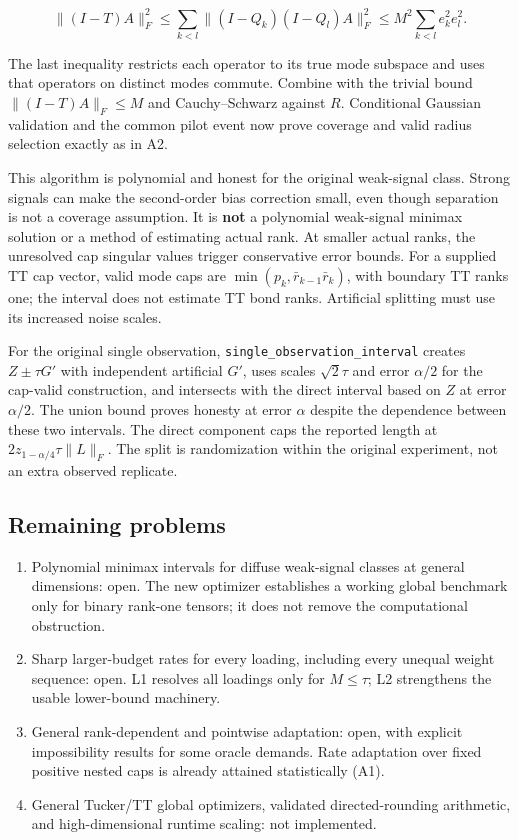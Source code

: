 \documentclass[
  10pt,
]{article}
\providecommand{\tightlist}{%
  \setlength{\itemsep}{0pt}\setlength{\parskip}{0pt}}
\begin{document}
\[\|(I-T)A\|_F^2\le\sum_{k<l}
\|(I-Q_k)(I-Q_l)A\|_F^2
\le M^2\sum_{k<l}e_k^2e_l^2.\]

The last inequality restricts each operator to its true mode subspace
and uses that operators on distinct modes commute. Combine with the
trivial bound \(\|(I-T)A\|_F\le M\) and Cauchy--Schwarz against \(R\).
Conditional Gaussian validation and the common pilot event now prove
coverage and valid radius selection exactly as in A2.

This algorithm is polynomial and honest for the original weak-signal
class. Strong signals can make the second-order bias correction small,
even though separation is not a coverage assumption. It is \textbf{not}
a polynomial weak-signal minimax solution or a method of estimating
actual rank. At smaller actual ranks, the unresolved cap singular values
trigger conservative error bounds. For a supplied TT cap vector, valid
mode caps are \(\min(p_k,\bar r_{k-1}\bar r_k)\), with boundary TT ranks
one; the interval does not estimate TT bond ranks. Artificial splitting
must use its increased noise scales.

For the original single observation,
\texttt{single\_observation\_interval} creates \(Z\pm\tau G'\) with
independent artificial \(G'\), uses scales \(\sqrt2\tau\) and error
\(\alpha/2\) for the cap-valid construction, and intersects with the
direct interval based on \(Z\) at error \(\alpha/2\). The union bound
proves honesty at error \(\alpha\) despite the dependence between these
two intervals. The direct component caps the reported length at
\(2z_{1-\alpha/4}\tau\|L\|_F\). The split is randomization within the
original experiment, not an extra observed replicate.

\subsection{Remaining problems}\label{remaining-problems}

\begin{enumerate}
\def\labelenumi{\arabic{enumi}.}
\tightlist
\item
  Polynomial minimax intervals for diffuse weak-signal classes at
  general dimensions: open. The new optimizer establishes a working
  global benchmark only for binary rank-one tensors; it does not remove
  the computational obstruction.
\item
  Sharp larger-budget rates for every loading, including every unequal
  weight sequence: open. L1 resolves all loadings only for \(M\le\tau\);
  L2 strengthens the usable lower-bound machinery.
\item
  General rank-dependent and pointwise adaptation: open, with explicit
  impossibility results for some oracle demands. Rate adaptation over
  fixed positive nested caps is already attained statistically (A1).
\item
  General Tucker/TT global optimizers, validated directed-rounding
  arithmetic, and high-dimensional runtime scaling: not implemented.
\end{enumerate}
\end{document}
